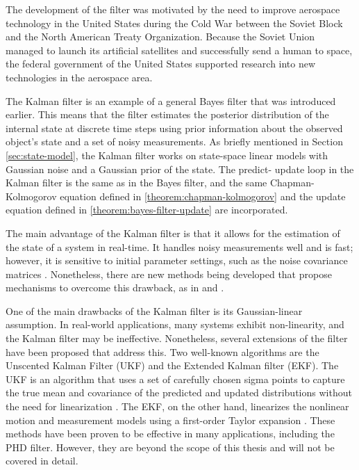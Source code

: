 The development of the filter was motivated by the need to improve aerospace 
technology in the United States during the Cold War between the Soviet Block 
and the North American Treaty Organization. Because the Soviet Union managed to 
launch its artificial satellites and successfully send a human to space, the 
federal government of the United States supported research into new 
technologies in the aerospace area.

The Kalman filter is an example of a general Bayes filter that was introduced 
earlier. This means that the filter estimates the posterior distribution of the 
internal state at discrete time steps using prior information about the 
observed object's state and a set of noisy measurements. As briefly mentioned 
in Section \ref{sec:state-model}, the Kalman filter works on state-space linear 
models with Gaussian noise and a Gaussian prior of the state. The predict-
update loop in the Kalman filter is the same as in the Bayes filter, and the 
same Chapman-Kolmogorov equation defined in \ref{theorem:chapman-kolmogorov} 
and the update equation defined in \ref{theorem:bayes-filter-update} are 
incorporated.

The main advantage of the Kalman filter is that it allows for the estimation of 
the state of a system in real-time. It handles noisy measurements well and is 
fast; however, it is sensitive to initial parameter settings, such as the noise 
covariance matrices \cite{gePerformanceAnalysisKalman2016}. Nonetheless, there 
are new methods being developed that propose mechanisms to overcome this 
drawback, as in \cite{matiskoNoiseCovariancesEstimation2010} and 
\cite{yuenOnlineEstimationNoise2013}.

One of the main drawbacks of the Kalman filter is its Gaussian-linear 
assumption. In real-world applications, many systems exhibit non-linearity, and 
the Kalman filter may be ineffective. Nonetheless, several extensions of the 
filter have been proposed that address this. Two well-known algorithms are the 
Unscented Kalman Filter (UKF) and the Extended Kalman filter (EKF). The UKF is 
an algorithm that uses a set of carefully chosen sigma points to capture the 
true mean and covariance of the predicted and updated distributions without 
the need for linearization \cite{wanUnscentedKalmanFilter2000}. The EKF, on 
the other hand, linearizes the nonlinear motion and measurement models using a 
first-order Taylor expansion \cite{smithApplicationStatisticalFilter1962}. 
These methods have been proven to be effective in many applications, including 
the PHD filter. However, they are beyond the scope of this thesis and will not 
be covered in detail.

